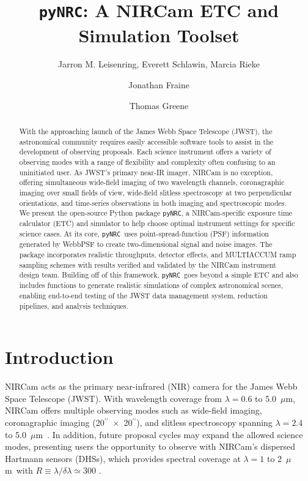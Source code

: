 \documentclass[]{emulateapj}
\newcommand{\pynrc}{\texttt{\MakeLowercase{py}NRC}}
\def\arcsec{{$^{\prime\prime}$}}
\newcommand{\um}{$\mu$m}
\begin{document}
\title{\pynrc: A NIRCam ETC and Simulation Toolset}

\author{Jarron M. Leisenring, Everett Schlawin, Marcia Rieke}

\author{Jonathan Fraine}

\author{Thomas Greene}


\begin{abstract}
With the approaching launch of the James Webb Space Telescope (JWST), the astronomical community requires easily accessible software tools to assist in the development of observing proposals. Each science instrument offers a variety of observing modes with a range of flexibility and complexity often confusing to an uninitiated user. As JWST's primary near-IR imager, NIRCam is no exception, offering simultaneous wide-field imaging of two wavelength channels, coronagraphic imaging over small fields of view, wide-field slitless spectroscopy at two perpendicular orientations, and time-series observations in both imaging and spectroscopic modes. We present the open-source Python package \pynrc, a NIRCam-specific exposure time calculator (ETC) and simulator to help choose optimal instrument settings for specific science cases. At its core, \pynrc\ uses point-spread-function (PSF) information generated by WebbPSF to create two-dimensional signal and noise images. The package incorporates realistic throughputs, detector effects, and MULTIACCUM ramp sampling schemes with results verified and validated by the NIRCam instrument design team. Building off of this framework, \pynrc\ goes beyond a simple ETC and also includes functions to generate realistic simulations of complex astronomical scenes, enabling end-to-end testing of the JWST data management system, reduction pipelines, and analysis techniques.
\end{abstract}


\section{Introduction}

NIRCam acts as the primary near-infrared (NIR) camera for the James Webb Space Telescope (JWST). With wavelength coverage from $\lambda=0.6$ to 5.0~\um, NIRCam offers multiple observing modes such as wide-field imaging, coronagraphic imaging (20\arcsec~$\times$~20\arcsec), and slitless spectroscopy spanning $\lambda=2.4$ to 5.0~\um\ \citep{beic12, kris07, riek05, gree07, gree17}. In addition, future proposal cycles may expand the allowed science modes, presenting users the opportunity to observe with NIRCam's dispersed Hartmann sensors (DHSs), which provides spectral coverage at $\lambda=1$ to 2~\um\ with $R \equiv \lambda/\delta\lambda \simeq 300$ \citep{schl17}.
\end{document}
